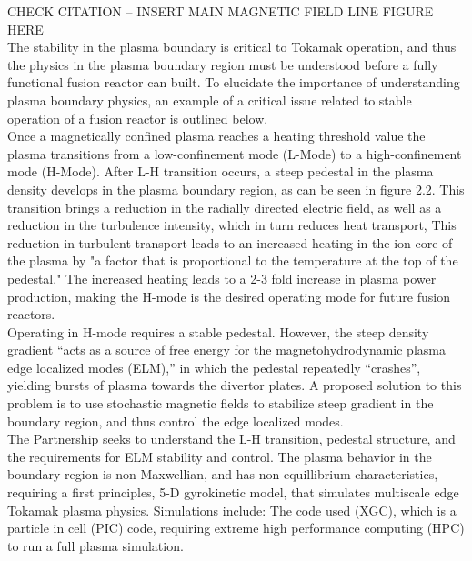 \documentclass{article}
\begin{document}
CHECK CITATION – INSERT MAIN MAGNETIC FIELD LINE FIGURE HERE\\

The stability in the plasma boundary is critical to Tokamak operation, and thus the physics in the plasma boundary region must be understood before a fully functional fusion reactor can built. To elucidate the importance of understanding plasma boundary physics, an example of a critical issue related to stable operation of a fusion reactor is outlined below.\\

Once a magnetically confined plasma reaches a heating threshold value the plasma transitions from a low-confinement mode (L-Mode) to a high-confinement mode (H-Mode). After L-H transition occurs, a steep pedestal in the plasma density develops in the plasma boundary region, as can be seen in figure 2.2. This transition brings a reduction in the radially directed electric field, as well as a reduction in the turbulence intensity, which in turn reduces heat transport, This reduction in turbulent transport leads to an increased heating in the ion core of the plasma by "a factor that is proportional to the temperature at the top of the pedestal." \cite{PPPL_P:2} The increased heating leads to a 2-3 fold increase in plasma power production, making the H-mode is the desired operating mode for future fusion reactors.\\

Operating in H-mode requires a stable pedestal. However, the steep density gradient “acts as a source of free energy for the magnetohydrodynamic plasma edge localized modes (ELM),” \cite{PPPL_P:2}  in which the pedestal repeatedly “crashes”, yielding bursts of plasma towards the divertor plates. A proposed solution to this problem is to use stochastic magnetic fields to stabilize steep gradient in the boundary region, and thus control the edge localized modes.\\

The Partnership seeks to understand  the L-H transition, pedestal structure, and  the requirements for ELM stability and control.  The plasma behavior in the boundary region is non-Maxwellian, and has non-equillibrium characteristics, requiring a first principles, 5-D gyrokinetic model, that simulates multiscale edge Tokamak plasma physics. Simulations include: The code used  (XGC), which is a particle in cell (PIC) code, requiring extreme high performance computing (HPC) to run a full plasma simulation.
\end{document}
